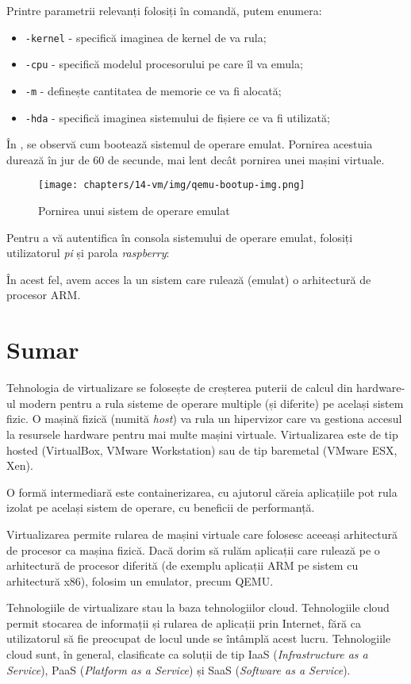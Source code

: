 Printre parametrii relevanți folosiți în comandă, putem enumera:

\begin{itemize}
  \item \texttt{-kernel} - specifică imaginea de kernel de va rula;
  \item \texttt{-cpu} - specifică modelul procesorului pe care îl va emula;
  \item \texttt{-m} - definește cantitatea de memorie ce va fi alocată;
  \item \texttt{-hda} - specifică imaginea sistemului de fișiere ce va fi utilizată;
\end{itemize}

În , se observă cum bootează sistemul de
operare emulat. Pornirea acestuia durează în jur de 60 de secunde, mai lent
decât pornirea unei mașini virtuale.

\begin{figure}[!htbp]
  \centering
  \texttt{[image: chapters/14-vm/img/qemu-bootup-img.png]}
  \caption{Pornirea unui sistem de operare emulat}
  \label{fig:vm:qemu-bootup}
\end{figure}

Pentru a vă autentifica în consola sistemului de operare emulat, folosiți
utilizatorul \textit{pi} și parola \textit{raspberry}:


În acest fel, avem acces la un sistem care rulează (emulat) o arhitectură de procesor ARM.
\newpage
\section{Sumar}
\label{sec:vm:summary}

Tehnologia de virtualizare se folosește de creșterea puterii de calcul din hardware-ul modern pentru a rula sisteme de operare multiple (și diferite) pe același sistem fizic.
O mașină fizică (numită \textit{host}) va rula un hipervizor care va gestiona accesul la resursele hardware pentru mai multe mașini virtuale.
Virtualizarea este de tip hosted (VirtualBox, VMware Workstation) sau de tip baremetal (VMware ESX, Xen).

O formă intermediară este containerizarea, cu ajutorul căreia aplicațiile pot rula izolat pe același sistem de operare, cu beneficii de performanță.

Virtualizarea permite rularea de mașini virtuale care folosesc aceeași arhitectură de procesor ca mașina fizică.
Dacă dorim să rulăm aplicații care rulează pe o arhitectură de procesor diferită (de exemplu aplicații ARM pe sistem cu arhitectură x86), folosim un emulator, precum QEMU.

Tehnologiile de virtualizare stau la baza tehnologiilor cloud.
Tehnologiile cloud permit stocarea de informații și rularea de aplicații prin Internet, fără ca utilizatorul să fie preocupat de locul unde se întâmplă acest lucru.
Tehnologiile cloud sunt, în general, clasificate ca soluții de tip IaaS (\textit{Infrastructure as a Service}), PaaS (\textit{Platform as a Service}) și SaaS (\textit{Software as a Service}).
